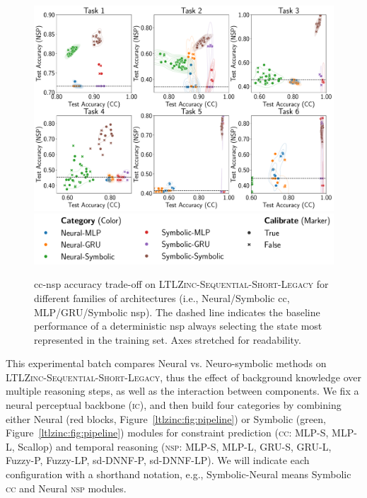 \begin{figure}
	\centering
	\includegraphics[width=1.0\textwidth]{imgs/ijcai/const-vs-succ.pdf}
	\includegraphics[width=1.0\textwidth]{imgs/ijcai/const-vs-succ_legend.pdf}
	\caption[{\sc cc}-{\sc nsp} accuracy trade-off on \textsc{LTLZinc-Sequential-Short-Legacy}]{{\sc cc}-{\sc nsp} accuracy trade-off on \textsc{LTLZinc-Sequential-Short-Legacy} for different families of architectures (i.e., Neural/Symbolic {\sc cc}, MLP/GRU/Symbolic {\sc nsp}). The dashed line indicates the baseline performance of a deterministic {\sc nsp} always selecting the state most represented in the training set. Axes stretched for readability.}
\label{ijcai:fig:main}
\end{figure}
This experimental batch compares Neural vs. Neuro-symbolic methods on \textsc{LTLZinc-Sequential-Short-Legacy}, thus the effect of background knowledge over multiple reasoning steps, as well as the interaction between components.
We fix a neural perceptual backbone (\textsc{ic}), and then build four categories by combining either Neural (red blocks, Figure~\ref{ltlzinc:fig:pipeline}) or Symbolic (green, Figure~\ref{ltlzinc:fig:pipeline}) modules for constraint prediction (\textsc{cc}: MLP-S, MLP-L, Scallop) and temporal reasoning (\textsc{nsp}: MLP-S, MLP-L, GRU-S, GRU-L, Fuzzy-P, Fuzzy-LP, sd-DNNF-P, sd-DNNF-LP). %
We will indicate each configuration with a shorthand notation, e.g., Symbolic-Neural means Symbolic \textsc{cc} and Neural \textsc{nsp} modules.
